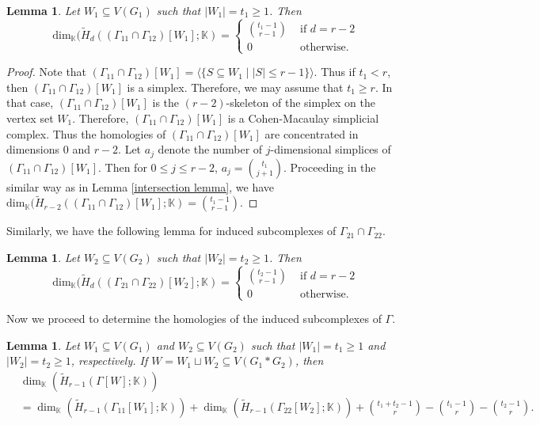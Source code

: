 \documentclass[12pt,reqno]{amsart}
\newtheorem{lemma}[proposition]{Lemma}
\theoremstyle{definition}
\newcommand{\K}{\mathbb K}
\begin{document}
\begin{lemma}\label{further intersection lemma1}
    Let $W_1\subseteq V(G_1)$ such that $|W_1|=t_1\ge 1$. Then
   {\footnotesize
    \[
    \mathrm{dim}_{\K}(\widetilde H_d((\Gamma_{11}\cap\Gamma_{12})[W_1];\mathbb K)=\begin{cases}
        {t_1-1\choose r-1}&\text{ if }d=r-2\\
        0 &\text{ otherwise}.
    \end{cases}
    \]}
\end{lemma}

\begin{proof}
    Note that $(\Gamma_{11}\cap\Gamma_{12})[W_1]=\langle \{S\subseteq W_1\mid |S|\le r-1\} \rangle$. Thus if $t_1<r$, then $(\Gamma_{11}\cap\Gamma_{12})[W_1]$ is a simplex. Therefore, we may assume that $t_1\ge r$. In that case, $(\Gamma_{11}\cap\Gamma_{12})[W_1]$ is the $(r-2)$-skeleton of the simplex on the vertex set $W_1$. Therefore, $(\Gamma_{11}\cap\Gamma_{12})[W_1]$ is a Cohen-Macaulay simplicial complex. Thus the homologies of $(\Gamma_{11}\cap\Gamma_{12})[W_1]$ are concentrated in dimensions $0$ and $r-2$. Let $a_j$ denote the number of $j$-dimensional simplices of $(\Gamma_{11}\cap\Gamma_{12})[W_1]$. Then for $0\le j\le r-2$, $a_j={t_1\choose j+1}$. Proceeding in the similar way as in Lemma \ref{intersection lemma}, we have $\mathrm{dim}_{\K}(\widetilde H_{r-2}((\Gamma_{11}\cap\Gamma_{12})[W_1];\mathbb K)={t_1-1\choose r-1}$.
\end{proof}

Similarly, we have the following lemma for induced subcomplexes of  $\Gamma_{21}\cap\Gamma_{22}$.
\begin{lemma}\label{further intersection lemma2}
    Let $W_2\subseteq V(G_2)$ such that $|W_2|=t_2\ge 1$. Then
   {\footnotesize
    \[
    \mathrm{dim}_{\K}(\widetilde H_d((\Gamma_{21}\cap\Gamma_{22})[W_2];\mathbb K)=\begin{cases}
        {t_2-1\choose r-1}&\text{ if }d=r-2\\
        0 &\text{ otherwise}.
    \end{cases}
    \]}
\end{lemma}
Now we proceed to determine the homologies of the induced subcomplexes of $\Gamma$.

\begin{lemma}\label{r-1 homology lemma}
    Let $W_1\subseteq V(G_1)$ and $W_2\subseteq V(G_2)$ such that $|W_1|=t_1\ge 1$ and $|W_2|=t_2\ge 1$, respectively. If $W=W_1\sqcup W_2\subseteq V(G_1*G_2)$, then
{\footnotesize
    \begin{align*}
     &\dim_{\K}(\widetilde H_{r-1}(\Gamma[W];\K))\\
     &=\dim_{\K}(\widetilde H_{r-1}(\Gamma_{11}[W_1];\K))+\dim_{\K}(\widetilde H_{r-1}(\Gamma_{22}[W_2];\K))+{t_1+t_2-1\choose r}-{t_1-1\choose r}-{t_2-1\choose r}.   
    \end{align*}}
     \end{lemma}
\end{document}

